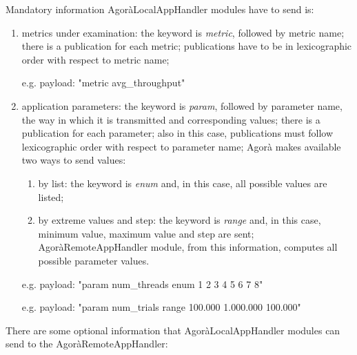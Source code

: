 Mandatory information AgoràLocalAppHandler modules have to send is:

\begin{enumerate}

    \item metrics under examination: the keyword is \textit{metric}, followed by metric name; there is a publication for each metric; publications have to be in lexicographic order with respect to metric name;
    
    e.g. payload: "metric avg\_throughput"
    
    \item application parameters: the keyword is \textit{param}, followed by parameter name, the way in which it is transmitted and corresponding values; there is a publication for each parameter; also in this case, publications must follow lexicographic order with respect to parameter name; Agorà makes available two ways to send values:
    
    \begin{enumerate}
    
        \item by list: the keyword is \textit{enum} and, in this case, all possible values are listed;
        
        \item by extreme values and step: the keyword is \textit{range} and, in this case, minimum value, maximum value and step are sent; AgoràRemoteAppHandler module, from this information, computes all possible parameter values.
    
    \end{enumerate}
    
    e.g. payload: "param num\_threads enum 1 2 3 4 5 6 7 8"
    
    e.g. payload: "param num\_trials range 100.000 1.000.000 100.000"

\end{enumerate}

There are some optional information that AgoràLocalAppHandler modules can send to the AgoràRemoteAppHandler:

